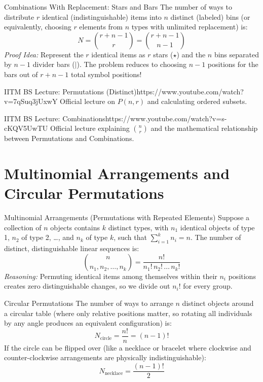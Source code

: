 \begin{definitionbox}{Combinations With Replacement: Stars and Bars}
The number of ways to distribute $r$ identical (indistinguishable) items into $n$ distinct (labeled) bins (or equivalently, choosing $r$ elements from $n$ types with unlimited replacement) is:
$$N = \binom{r + n - 1}{r} = \binom{r + n - 1}{n - 1}$$
\textit{Proof Idea:} Represent the $r$ identical items as $r$ stars ($\star$) and the $n$ bins separated by $n-1$ divider bars ($|$). The problem reduces to choosing $n-1$ positions for the bars out of $r + n - 1$ total symbol positions!
\end{definitionbox}

\begin{videocard}{IITM BS Lecture: Permutations (Distinct)}{https://www.youtube.com/watch?v=7qSuq3jUxwY}
Official lecture on $P(n, r)$ and calculating ordered subsets.
\end{videocard}

\begin{videocard}{IITM BS Lecture: Combinations}{https://www.youtube.com/watch?v=s-cKQV5UwTU}
Official lecture explaining $\binom{n}{r}$ and the mathematical relationship between Permutations and Combinations.
\end{videocard}

\section{Multinomial Arrangements and Circular Permutations}

\begin{theorembox}{Multinomial Arrangements (Permutations with Repeated Elements)}
Suppose a collection of $n$ objects contains $k$ distinct types, with $n_1$ identical objects of type 1, $n_2$ of type 2, \dots, and $n_k$ of type $k$, such that $\sum_{i=1}^k n_i = n$.
The number of distinct, distinguishable linear sequences is:
$$\binom{n}{n_1, n_2, \dots, n_k} = \frac{n!}{n_1! \, n_2! \, \dots \, n_k!}$$
\textit{Reasoning:} Permuting identical items among themselves within their $n_i$ positions creates zero distinguishable changes, so we divide out $n_i!$ for every group.
\end{theorembox}

\begin{theorembox}{Circular Permutations}
The number of ways to arrange $n$ distinct objects around a circular table (where only relative positions matter, so rotating all individuals by any angle produces an equivalent configuration) is:
$$N_{\text{circle}} = \frac{n!}{n} = (n-1)!$$
If the circle can be flipped over (like a necklace or bracelet where clockwise and counter-clockwise arrangements are physically indistinguishable):
$$N_{\text{necklace}} = \frac{(n-1)!}{2}$$
\end{theorembox}

